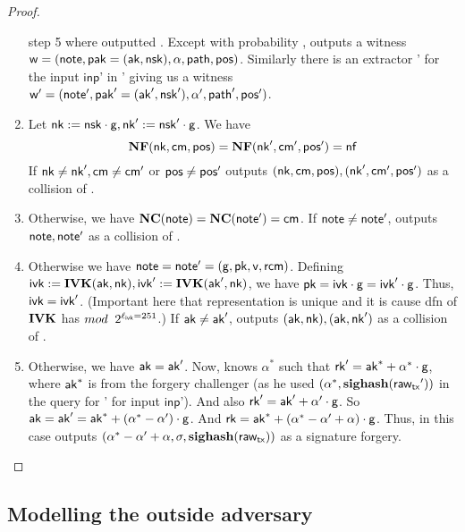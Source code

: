 \documentclass[11pt]{article}
\numberwithin{equation}{section} %
\numberwithin{figure}{section} %
\newcommand{\inp}{\ensuremath{\mathsf{inp}}\xspace}
\begin{document}
\begin{proof}
\begin{enumerate}
 step 5 where \adv outputted \tx.
 Except with probability \negl, \ext outputs a witness $\mathsf{w}=(\mathsf{note},\mathsf{pak}=(\mathsf{ak},\mathsf{nsk}),\alpha,\mathsf{path},\mathsf{pos})$.
 Similarly there is an extractor \ext' for the input \inp' in \tx' giving us a witness $\mathsf{w}'=(\mathsf{note}',\mathsf{pak}'=(\mathsf{ak}',\mathsf{nsk}'),\alpha',\mathsf{path}',\mathsf{pos}')$.
\item Let $\mathsf{nk}:= \mathsf{nsk}\cdot \mathsf{g}, \mathsf{nk}':= \mathsf{nsk}'\cdot \mathsf{g}$.  We have \[\mathbf{NF}(\mathsf{nk},\mathsf{cm},\mathsf{pos}) = \mathbf{NF}(\mathsf{nk}',\mathsf{cm}',\mathsf{pos}')=\mathsf{nf}\]
If $\mathsf{nk}\neq\mathsf{nk}',\mathsf{cm}\neq\mathsf{cm}'$ or $\mathsf{pos}\neq \mathsf{pos}'$ \advprime outputs $(\mathsf{nk},\mathsf{cm},\mathsf{pos}), (\mathsf{nk}',\mathsf{cm}',\mathsf{pos}')$ as a collision of \NF.
\item Otherwise, we have $\mathbf{NC}(\mathsf{note})=\mathbf{NC}(\mathsf{note}')=\mathsf{cm}$.
If $\mathsf{note} \neq \mathsf{note}'$, \advprime outputs $\mathsf{note},\mathsf{note}'$ as a collision of \notecom.

\item Otherwise we have $\mathsf{note}=\mathsf{note}'=(\mathsf{g},\mathsf{pk},\mathsf{v},\mathsf{rcm})$.
Defining
$\mathsf{ivk}:= \mathbf{IVK}(\mathsf{ak},\mathsf{nk}), \mathsf{ivk}':= \mathbf{IVK}(\mathsf{ak}',\mathsf{nk})$,
we have $\mathsf{pk}= \mathsf{ivk}\cdot \mathsf{g} = \mathsf{ivk}'\cdot \mathsf{g}$. 
Thus, $\mathsf{ivk}=\mathsf{ivk}'$.
(Important here that \ivk representation is unique and it is cause dfn of $\mathbf{IVK}$ has $mod\;\; 2^{\ell_{\mathsf{ivk}}=251}$.)
If $\mathsf{ak}\neq \mathsf{ak}'$, \advprime outputs $(\mathsf{ak},\mathsf{nk}),(\mathsf{ak},\mathsf{nk}')$ as a collision of \IVK.

\item Otherwise, we have $\mathsf{ak}=\mathsf{ak}'$.
 Now, \adv knows $\alpha^*$ such that $\mathsf{rk}' = \mathsf{ak}^* + \alpha^*\cdot \mathsf{g}$, where $\mathsf{ak}^*$ is from the forgery challenger (as he used $(\alpha^*,\mathbf{sighash}(\mathsf{raw_{tx}}'))$ in the \signallinputs query for \tx' for input \inp').
And also $\mathsf{rk}' = \mathsf{ak}' + \alpha'\cdot \mathsf{g}$.
So $\mathsf{ak}=\mathsf{ak}'= \mathsf{ak}^* + (\alpha^*-\alpha')\cdot\mathsf{g}$.
And $\mathsf{rk} = \mathsf{ak}^* +(\alpha^*-\alpha'+\alpha)\cdot \mathsf{g}$.
Thus, in this case \advprime outputs $(\alpha^*-\alpha'+\alpha, \sigma, \mathbf{sighash}(\mathsf{raw_{tx}}))$ as a signature forgery.
 
\end{enumerate}

\end{proof}
\newcommand{\tree}{\ensuremath{\mathsf{T}}\xspace}
\newcommand{\curnotes}{\ensuremath{\mathsf{N}}\xspace}

\newcommand{\maketransaction}{\ensuremath{\mathsf{maketransaction}}\xspace}
\subsection{Modelling the outside adversary}
\end{document}
